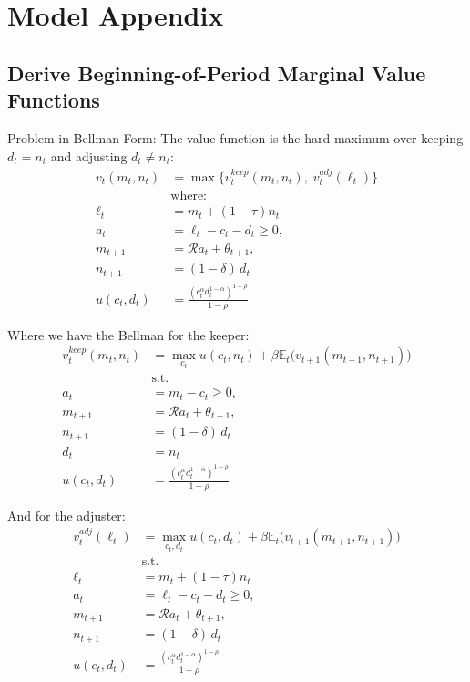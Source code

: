 \section{Model Appendix}\label{sec:appdx_model_basic}
\subsection{Derive Beginning-of-Period Marginal Value Functions}

Problem in Bellman Form:
The value function is the hard maximum over keeping $d_t = n_t$ and adjusting $d_t \neq n_t$:
\begin{align}
	v_t(m_t,n_t) &= \max\Big\{ v_t^{keep}(m_t,n_t),\; v_t^{adj}(\ell_t) \Big\}\\
	& \text{where:} \nonumber\\
	\ell_t &= m_t + (1 - \tau) n_t \\
	a_t &=\ell_t - c_t - d_t \geq 0,\\
	m_{t+1} &= \mathcal{R} a_t + \theta_{t+1},\\
	n_{t+1} &= (1-\delta)\,d_t\\
	u(c_t,d_t) &= \frac{(c_t^\alpha d_t^{1 - \alpha})^{1 - \rho}}{1 - \rho}
\end{align}

Where we have the Bellman for the keeper:
\begin{align}
	v_t^{keep}(m_t,n_t) &= \max_{c_t} u(c_t,n_t) + \beta \mathbb{E}_t \Big(v_{t+1}(m_{t+1}, n_{t+1})\Big)\\
	& \text{s.t.} \nonumber\\
	a_t &= m_t- c_t \geq 0,\\
	m_{t+1} &= \mathcal{R} a_t + \theta_{t+1},\\
	n_{t+1} &= (1-\delta)\,d_t\\
	d_t &= n_t \\
	u(c_t,d_t) &= \frac{(c_t^\alpha d_t^{1 - \alpha})^{1 - \rho}}{1 - \rho}
\end{align}

And for the adjuster:
\begin{align}
	v_t^{adj}(\ell_t) &= \max_{c_t,d_t} u(c_t,d_t) + \beta \mathbb{E}_t \Big(v_{t+1}(m_{t+1}, n_{t+1})\Big)\\
	& \text{s.t.} \nonumber \\
	\ell_t &= m_t + (1 - \tau) n_t \\
	a_t &= \ell_t - c_t - d_t \geq 0,\\
	m_{t+1} &= \mathcal{R} a_t + \theta_{t+1},\\
	n_{t+1} &= (1-\delta)\,d_t\\
	u(c_t,d_t) &= \frac{(c_t^\alpha d_t^{1 - \alpha})^{1 - \rho}}{1 - \rho}
\end{align}



